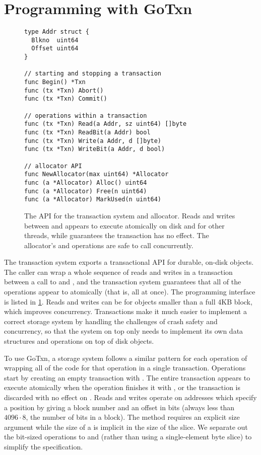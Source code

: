 \section{Programming with GoTxn}
\label{sec:txn:api}

\begin{figure}
\begin{verbatim}
type Addr struct {
  Blkno  uint64
  Offset uint64
}

// starting and stopping a transaction
func Begin() *Txn
func (tx *Txn) Abort()
func (tx *Txn) Commit()

// operations within a transaction
func (tx *Txn) Read(a Addr, sz uint64) []byte
func (tx *Txn) ReadBit(a Addr) bool
func (tx *Txn) Write(a Addr, d []byte)
func (tx *Txn) WriteBit(a Addr, d bool)

// allocator API
func NewAllocator(max uint64) *Allocator
func (a *Allocator) Alloc() uint64
func (a *Allocator) Free(n uint64)
func (a *Allocator) MarkUsed(n uint64)
\end{verbatim}
  \caption{The API for the transaction system and allocator. Reads and writes
    between  and  appears to execute atomically on disk and
    for other threads, while  guarantees the transaction has no
    effect. The allocator's  and  operations are safe to call
    concurrently.}
\label{fig:txn-api}
\end{figure}

The transaction system exports a transactional API for durable, on-disk objects. The caller can wrap a whole
sequence of reads and writes in a transaction between a call to  and
, and the transaction system guarantees that all of the operations
appear to atomically (that is, all at once). The
programming interface is listed in \cref{fig:txn-api}. Reads and writes can be
for objects smaller than a full 4KB block, which improves concurrency.
Transactions make it much easier to implement a correct storage system by
handling the challenges of crash safety and concurrency, so that the system on
top only needs to implement its own data structures and operations on top of
disk objects.

To use GoTxn, a storage system follows a similar pattern for each operation of
wrapping all of the code for that operation in a single transaction. Operations
start by creating an empty transaction with .
The entire
transaction appears to execute atomically when the operation finishes it
with , or the transaction is discarded with no effect on
. Reads and writes operate on addresses which specify a
position by giving a block number and an offset in bits (always less
than $4096 \cdot 8$, the number of bits in a block). The 
method requires an explicit size argument while the size of a
 is implicit in the size of the  slice. We separate
out the bit-sized operations to  and  (rather
than using a single-element byte slice) to simplify the specification.

